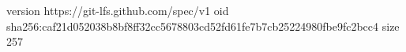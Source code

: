 version https://git-lfs.github.com/spec/v1
oid sha256:caf21d052038b8bf8ff32cc5678803cd52fd61fe7b7cb25224980fbe9fc2bcc4
size 257
